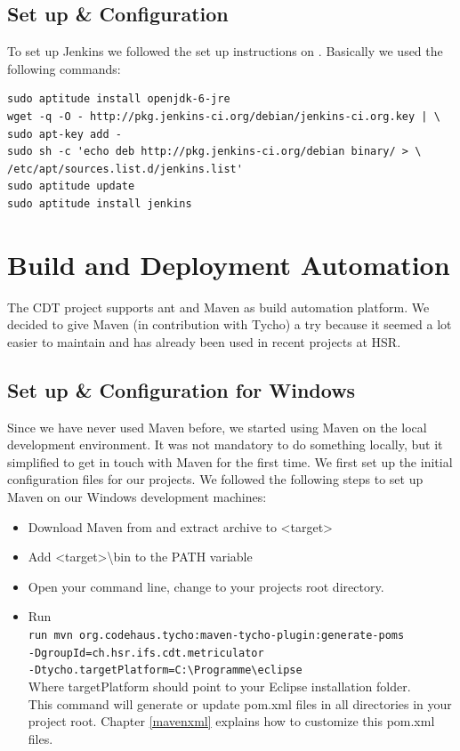 \documentclass[11pt,a4paper,oneside]{scrreprt}
\begin{document}
\subsection{Set up \& Configuration}
To set up Jenkins we followed the set up instructions on \cite{jenkinssetup}. Basically we used the following commands:\\
\begin{minipage}[t]{\textwidth}
\begin{lstlisting}[style=console, caption=Jenkins set up commands]
sudo aptitude install openjdk-6-jre
wget -q -O - http://pkg.jenkins-ci.org/debian/jenkins-ci.org.key | \
sudo apt-key add -
sudo sh -c 'echo deb http://pkg.jenkins-ci.org/debian binary/ > \
/etc/apt/sources.list.d/jenkins.list'
sudo aptitude update
sudo aptitude install jenkins
\end{lstlisting}
\end{minipage}

\section{Build and Deployment Automation}
The CDT project supports ant and Maven as build automation platform. We decided to give Maven (in contribution with Tycho) a try because it seemed a lot easier to maintain and has already been used in recent projects at HSR.

\subsection{Set up \& Configuration for Windows}\label{mavenwindows}
Since we have never used Maven before, we started using Maven on the local development environment. It was not mandatory to do something locally, but it simplified to get in touch with Maven for the first time. We first set up the initial configuration files for our projects. We followed the following steps to set up Maven on our Windows development machines:

\begin{itemize}
\item Download Maven from \cite{mavendownload} and extract archive to <target>
\item Add <target>\textbackslash bin to the PATH variable
\item Open your command line, change to your projects root directory.
\item Run\\\texttt{run mvn org.codehaus.tycho:maven-tycho-plugin:generate-poms \
\\-DgroupId=ch.hsr.ifs.cdt.metriculator 
\\-Dtycho.targetPlatform=C:\textbackslash Programme\textbackslash eclipse}
\\Where targetPlatform should point to your Eclipse installation folder.
\\ This command will generate or update pom.xml files in all directories in your project root. Chapter \ref{mavenxml} explains how to customize this pom.xml files.
\end{itemize}
\end{document}
